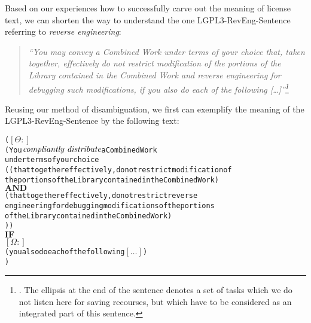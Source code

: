 %
%
%
%
%

Based on our experiences how to successfully carve out the meaning of license
text, we can shorten the way to understand the one LGPL3-RevEng-Sentence
referring to \emph{reverse engineering}:

\begin{quote}\emph{\enquote{You may convey a Combined Work under terms of your
choice that, taken together, effectively do not restrict modification of the
portions of the Library contained in the Combined Work and reverse engineering
for debugging such modifications, if you also do each of the following
[\ldots]}\footnote{\cite[cf.][\nopage wp., §4]{Lgpl30OsiLicense2007a}. The
ellipsis at the end of the sentence denotes a set of tasks which we do not
listen here for saving recourses, but which have to be considered as an
integrated part of this sentence.}}
\end{quote}

Reusing our method of disambiguation, we first can exemplify the meaning of the
LGPL3-RevEng-Sentence by the following text:

\begin{alltt}   
( \([\Theta:]\)
  ( You \(\emph{compliantly distribute}\) a Combined Work 
    under terms of your choice 
    (   (that together effectively, do not restrict modification of 
        the portions of the Library contained in the Combined Work)
    \(\textbf{AND}\) 
        (that together effectively, do not restrict reverse
        engineering for debugging modifications of the portions
        of the Library contained in the Combined Work)
  )  )
  \(\textbf{IF}\)
  \([\Omega:]\) 
  ( you also do each of the following \([\ldots]\))
)
\end{alltt}

